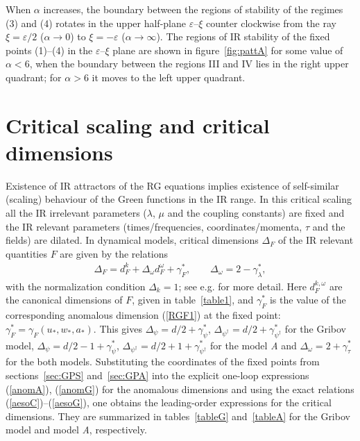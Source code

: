 \documentclass[12pt]{article}
\begin{document}
When $\alpha$ increases, the boundary between the regions of stability of
the regimes (3) and (4) rotates in the upper half-plane $\varepsilon$--$\xi$
counter clockwise from the ray $\xi=\varepsilon/2$ ($\alpha\to0$) to
$\xi=-\varepsilon$ ($\alpha\to\infty$).
The regions of IR stability of the fixed points (1)--(4) in the
$\varepsilon$--$\xi$ plane are shown in figure~\ref{fig:pattA}
for some value of $\alpha<6$, when the boundary between the regions
III and IV lies in the right upper quadrant; for $\alpha>6$ it moves
to the left upper quadrant.



\section{Critical scaling and critical dimensions} \label{sec:DimeNS}

Existence of IR attractors of the RG equations implies existence of
self-similar (scaling) behaviour of the Green functions in the IR range.
In this critical scaling all the IR irrelevant parameters ($\lambda$,
$\mu$ and the coupling constants) are fixed and the IR relevant parameters
(times/frequencies, coordinates/momenta, $\tau$ and the fields) are dilated.
In dynamical models, critical dimensions $\Delta_{F}$ of the IR relevant
quantities $F$ are given by the relations
\begin{eqnarray}
\Delta_{F} = d^{k}_{F}+ \Delta_{\omega} d^{\omega}_{F} + \gamma_{F}^{*},
\qquad  \Delta_{\omega}=2 -\gamma_{\lambda}^{*},
\label{dim}
\end{eqnarray}
with the normalization condition $\Delta_{k} = 1$; see e.g. \cite{Book3}
for more detail. Here $d^{k,\omega}_{F}$ are the canonical dimensions of
$F$, given in table~\ref{table1}, and $\gamma_{F}^{*}$ is the value of the
corresponding anomalous dimension (\ref{RGF1}) at the fixed point:
$\gamma_{F}^{*} = \gamma_{F} (u_{*},w_{*},a_{*})$. This gives
$\Delta_{\psi} = d/2+ \gamma_{\psi}^{*}$,
$\Delta_{\psi^{\dag}} = d/2+ \gamma_{\psi^{\dag}}^{*}$ for the Gribov model,
$\Delta_{\psi} = d/2-1+ \gamma_{\psi}^{*}$,
$\Delta_{\psi^{\dag}} = d/2+1+ \gamma_{\psi^{\dag}}^{*}$ for the model
{\it A} and $\Delta_{\omega} = 2 + \gamma_{\tau}^{*}$ for the both models.
Substituting the coordinates of the fixed points from sections~\ref{sec:GPS}
and~\ref{sec:GPA} into the explicit one-loop expressions (\ref{anomA}),
(\ref{anomG}) for the anomalous dimensions and using the exact relations
(\ref{aesoC})--(\ref{aesoG}), one obtains the leading-order expressions
for the critical dimensions. They are summarized in tables~\ref{tableG}
and~\ref{tableA} for the Gribov model and model {\it A}, respectively.
\end{document}
